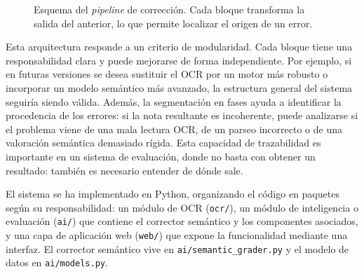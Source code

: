 \begin{figure}[ht]
\centering
{}
\caption{Esquema del \emph{pipeline} de corrección. Cada bloque transforma la salida del anterior, lo que permite localizar el origen de un error.}
\label{fig:pipeline}
\end{figure}

Esta arquitectura responde a un criterio de modularidad. Cada bloque tiene una responsabilidad clara y puede mejorarse de forma independiente. Por ejemplo, si en futuras versiones se desea sustituir el OCR por un motor más robusto o incorporar un modelo semántico más avanzado, la estructura general del sistema seguiría siendo válida. Además, la segmentación en fases ayuda a identificar la procedencia de los errores: si la nota resultante es incoherente, puede analizarse si el problema viene de una mala lectura OCR, de un parseo incorrecto o de una valoración semántica demasiado rígida. Esta capacidad de trazabilidad es importante en un sistema de evaluación, donde no basta con obtener un resultado: también es necesario entender de dónde sale.

El sistema se ha implementado en Python, organizando el código en paquetes según su responsabilidad: un módulo de OCR (\texttt{ocr/}), un módulo de inteligencia o evaluación (\texttt{ai/}) que contiene el corrector semántico y los componentes asociados, y una capa de aplicación web (\texttt{web/}) que expone la funcionalidad mediante una interfaz. El corrector semántico vive en \texttt{ai/semantic\_grader.py} y el modelo de datos en \texttt{ai/models.py}.

